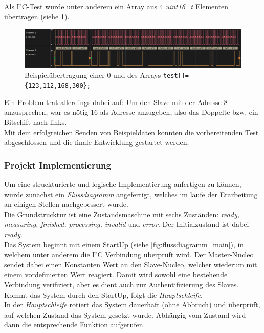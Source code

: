 \documentclass[11pt,a4paper,titlepage]{article}
\begin{document}
Als I²C-Test wurde unter anderem ein Array aus 4 \textit{uint16\_t} Elementen übertragen (siehe \cref{fig:i2c_test_transmission}).

\begin{figure}[H]
    \centering
    \includegraphics[width=1.1\textwidth]{./Bilder-Tobit/i2c_test_transmission.jpg}
    \caption{Beispielübertragung einer 0 und des Arrays \texttt{test[]=\{123,112,168,300\};}}
    \label{fig:i2c_test_transmission}
\end{figure}

Ein Problem trat allerdings dabei auf: Um den Slave mit der Adresse 8 anzusprechen,
war es nötig 16 als Adresse anzugeben, also das Doppelte bzw. ein Bitschift nach links.\\

Mit dem erfolgreichen Senden von Beispieldaten konnten die vorbereitenden Test abgeschlossen und die finale Entwicklung gestartet werden.

\subsubsection{Projekt Implementierung}

Um eine struckturierte und logische Implementierung anfertigen zu können, wurde zunächst ein \textit{Flussdiagramm} angefertigt,
welches im laufe der Erarbeitung an einigen Stellen nachgebessert wurde.\\

Die Grundstrucktur ist eine Zustandsmaschine mit sechs Zuständen: \textit{ready, measuring, finished, processing, invalid} und \textit{error}.
Der Initialzustand ist dabei \textit{ready}.\\

Das System beginnt mit einem StartUp (siehe \cref{fig:flussdiagramm_main}), in welchem unter anderem die I²C Verbindung überprüft wird.
Der Master-Nucleo sendet dabei einen Konstanten Wert an den Slave-Nucleo, welcher wiederum mit einem vordefinierten Wert reagiert.
Damit wird sowohl eine bestehende Verbindung verifiziert,
aber es dient auch zur Authentifizierung des Slaves.\\

Kommt das System durch den StartUp, folgt die \textit{Hauptschleife}.\\
In der \textit{Hauptschleife} rotiert das System dauerhaft (ohne Abbruch) und überprüft, auf welchen Zustand das System gesetzt wurde.
Abhängig vom Zustand wird dann die entsprechende Funktion aufgerufen.\\
\end{document}
